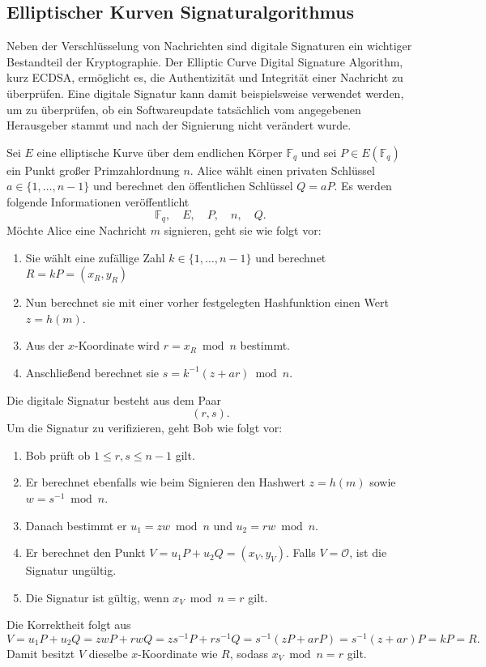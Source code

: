 \subsection{Elliptischer Kurven Signaturalgorithmus}
Neben der Verschlüsselung von Nachrichten sind digitale Signaturen
ein wichtiger Bestandteil der Kryptographie. Der Elliptic Curve Digital
Signature Algorithm, kurz ECDSA, ermöglicht es, die Authentizität und
Integrität einer Nachricht zu überprüfen. Eine digitale Signatur kann
damit beispielsweise verwendet werden, um zu überprüfen, ob ein
Softwareupdate tatsächlich vom angegebenen Herausgeber stammt und
nach der Signierung nicht verändert wurde.

Sei $E$ eine elliptische Kurve über dem endlichen Körper $\mathbb F_q$ und sei $P\in E(\mathbb F_q)$ ein Punkt großer Primzahlordnung $n$.
Alice wählt einen privaten Schlüssel $a\in\{1,\dots,n-1\}$ und berechnet den öffentlichen Schlüssel $Q=aP$. Es werden folgende Informationen veröffentlicht
\[
    \mathbb{F}_q,\quad E,\quad P,\quad n, \quad Q.
\]
Möchte Alice eine Nachricht $m$ signieren, geht sie wie folgt vor:
\begin{enumerate}
    \item Sie wählt eine zufällige Zahl $ k\in\{1,\dots,n-1\}$ und berechnet $R=kP=(x_R,y_R)$
    \item Nun berechnet sie mit einer vorher festgelegten Hashfunktion einen Wert $z=h(m)$.
    \item Aus der $x$-Koordinate wird \( r=x_R\bmod n \)
          bestimmt.
    \item Anschließend berechnet sie $s=k^{-1}(z+ar)\bmod n$.
\end{enumerate}
Die digitale Signatur besteht aus dem Paar
\[
    (r,s).
\]
Um die Signatur zu verifizieren, geht Bob wie folgt vor:
\begin{enumerate}
    \item Bob prüft ob \(1\leq r,s\leq n-1\) gilt.
    \item Er berechnet ebenfalls wie beim Signieren den Hashwert $z=h(m)$ sowie $w=s^{-1}\bmod n$.
    \item Danach bestimmt er $u_1=z w\bmod n$ und $u_2=r w\bmod n$.
    \item Er berechnet den Punkt $V=u_1P+u_2Q=(x_V,y_V)$. Falls $V=\mathcal O$, ist die Signatur ungültig.
    \item Die Signatur ist gültig, wenn $x_V\bmod n=r$ gilt.
\end{enumerate}
Die Korrektheit folgt aus
\[
    V=u_1P+u_2Q=zwP+rwQ=zs^{-1}P+rs^{-1}Q =s^{-1}(zP+arP)=s^{-1}(z+ar)P=kP=R.
\]
Damit besitzt $V$ dieselbe $x$-Koordinate wie $R$, sodass
$x_V\bmod n=r$ gilt.

